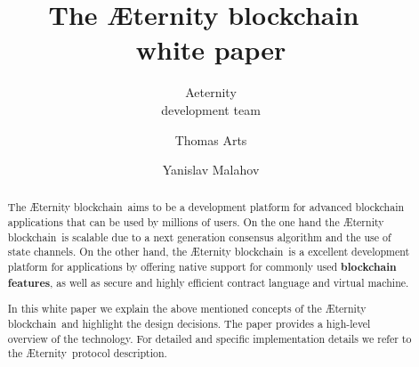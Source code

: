 \documentclass{article}
\newcommand{\blockchain}{{\AE}ternity blockchain}
\newcommand{\aet}{{\AE}ternity}
\begin{document}
%
\title{The \blockchain\ \\white paper}

\author{Aeternity\\development team  \and Thomas Arts \and
             Yanislav Malahov}

\maketitle

%
\begin{abstract}
The \blockchain\ aims to be a development platform for advanced blockchain
applications that can be used by millions of users.
On the one hand the \blockchain\ is scalable due to a next generation
consensus algorithm and the use of state channels. On the other hand,
the \blockchain\ is a excellent development platform for
applications by offering native support for commonly used
\textbf{blockchain features}, as well as secure and highly efficient
contract language and virtual machine.

In this white paper we explain the above mentioned concepts of the
\blockchain\ and highlight the design decisions. The
paper provides a high-level overview of the technology. For detailed
and specific implementation details we refer to the \aet\ protocol
description.

\end{abstract}










%

 
\end{document}
